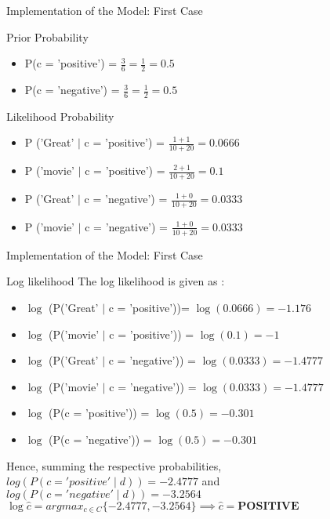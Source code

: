 \documentclass[usenames,dvipsnames]{beamer}
\begin{document}
\begin{frame}{Implementation of the Model: First Case}
	\begin{block}{Prior Probability}
		\begin{itemize}
		\item 	P(c = 'positive') = $\frac{3}{6} = \frac{1}{2} = 0.5$ 
		\item  	P(c = 'negative') = $\frac{3}{6} = \frac{1}{2} = 0.5$ 
		\end{itemize}
	\end{block}
\begin{block}{Likelihood Probability}
	\begin{itemize}
		\item P ('Great' $\mid$ c = 'positive') = $\frac{1 + 1}{10 + 20} = 0.0666$
		\item P ('movie' $\mid$ c = 'positive') = $\frac{2 + 1}{10 + 20} = 0.1$
		\item P ('Great' $\mid$ c = 'negative') = $\frac{1 + 0}{10 + 20} = 0.0333$
		\item P ('movie' $\mid$ c = 'negative') = $\frac{1 + 0}{10 + 20} = 0.0333$
	\end{itemize}
\end{block}
\end{frame}
\begin{frame}{Implementation of the Model: First Case}
	\begin{block}{Log likelihood}
The log likelihood is given as $\colon$ \\
\begin{itemize}
	\item $\log$ (P('Great' $\mid$ c = 'positive'))= $\log(0.0666) = -1.176$
	\item $\log$ (P('movie' $\mid$ c = 'positive')) = $\log(0.1) = -1$
	\item $\log$ (P('Great' $\mid$ c = 'negative')) = $\log(0.0333) = -1.4777$
	\item $\log$ (P('movie' $\mid$ c = 'negative')) = $\log(0.0333) = -1.4777$
	\item  $\log$ (P(c = 'positive')) = $\log(0.5) = -0.301$
	\item  $\log$ (P(c = 'negative')) = $\log(0.5) = -0.301$
\end{itemize}
\end{block}
\begin{block}{}
	Hence, summing the respective probabilities,
	$log (P(c = 'positive' \mid d)) = -2.4777$ and 
	$log (P (c = 'negative' \mid d)) = -3.2564$ \\
	$ \log \hat{c} =  argmax_{c \in C} \{ -2.4777, -3.2564\} \implies \hat{c} = \textbf{POSITIVE}$
\end{block}
\end{frame}
\end{document}
